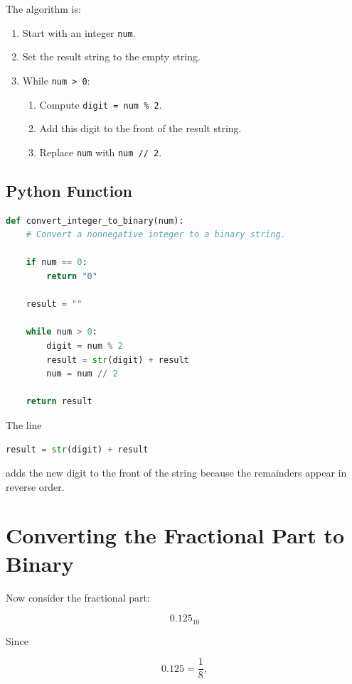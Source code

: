 \documentclass[11pt]{article}
\begin{document}
The algorithm is:

\begin{enumerate}
    \item Start with an integer \texttt{num}.
    \item Set the result string to the empty string.
    \item While \texttt{num > 0}:
    \begin{enumerate}
        \item Compute \texttt{digit = num \% 2}.
        \item Add this digit to the front of the result string.
        \item Replace \texttt{num} with \texttt{num // 2}.
    \end{enumerate}
\end{enumerate}

\subsection{Python Function}

\begin{lstlisting}[language=Python]
def convert_integer_to_binary(num):
    # Convert a nonnegative integer to a binary string.

    if num == 0:
        return "0"

    result = ""

    while num > 0:
        digit = num % 2
        result = str(digit) + result
        num = num // 2

    return result
\end{lstlisting}

The line

\begin{lstlisting}[language=Python]
result = str(digit) + result
\end{lstlisting}

adds the new digit to the front of the string because the remainders appear in reverse order.

\section{Converting the Fractional Part to Binary}

Now consider the fractional part:

\[
0.125_{10}
\]

Since

\[
0.125 = \frac{1}{8},
\]
\end{document}
